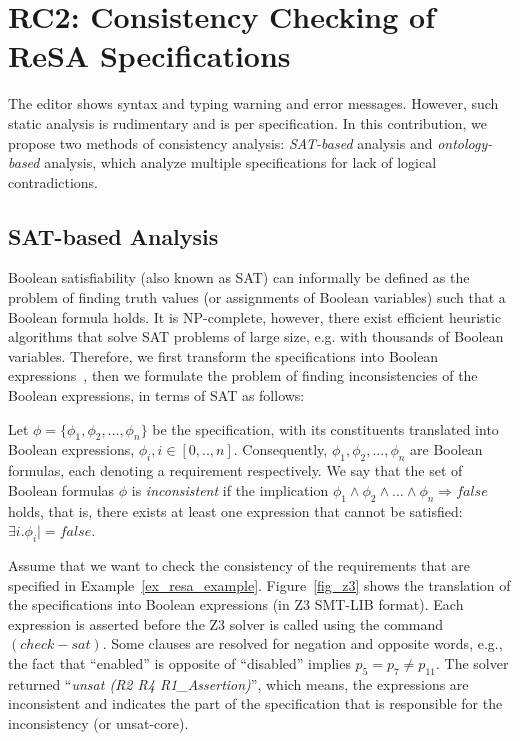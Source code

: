 \section[RC2: Consistency~Checking of {\sffamily ReSA}~Specifications]{\large RC2: Consistency Checking of {\sffamily ReSA} Specifications}\label{rc_resaanalysis}
The editor shows syntax and typing warning and error messages. However, such static analysis is rudimentary and is per specification. In this contribution, we propose two methods of consistency analysis: \textit{SAT-based} analysis and \textit{ontology-based} analysis, which analyze multiple specifications for lack of logical contradictions. 

\subsection*{SAT-based Analysis}
Boolean satisfiability (also known as SAT) can informally be defined as the problem of finding truth values (or assignments of Boolean variables) such that a Boolean formula holds. It is NP-complete, however, there exist efficient heuristic algorithms that solve SAT problems of large size, e.g. with thousands of Boolean variables. Therefore, we first transform the \resa{} specifications into Boolean expressions~\cite{resatool}, then we formulate the problem of finding inconsistencies of the Boolean expressions, in terms of SAT as follows:
\begin{definition}
	Let $\phi = \{\phi_1, \phi_2,\dots,\phi_n\}$ be the \resa{} specification, with its constituents translated into Boolean expressions,  $\phi_i, i \in [0,..,n]$. Consequently, $\phi_1, \phi_2,...,\phi_n$ are Boolean formulas, each denoting a requirement respectively. We say that the set of Boolean formulas $\phi$ is \textit{inconsistent} if the implication $\phi_1 \land \phi_2 \land\dots\land \phi_n \Rightarrow false$ holds, that is, there exists at least one expression that cannot be satisfied:  $\exists i. \phi_i |= false$. 
\end{definition}
\begin{example}
Assume that we want to check the consistency of the requirements that are specified in Example~\ref{ex_resa_example}. Figure~\ref{fig_z3} shows the translation of the specifications into Boolean expressions (in Z3  SMT-LIB format). Each expression is asserted before the Z3 solver is called using the command $(check-sat)$. Some clauses are resolved for negation and opposite words, e.g., the fact that ``enabled'' is opposite of ``disabled'' implies $p_5=p_7\neq p_{11}$. The solver returned ``\textit{unsat (R2 R4 R1\_Assertion)}'',  which means, the expressions are inconsistent and indicates the part of the specification that is responsible for the inconsistency (or unsat-core).
\end{example}
